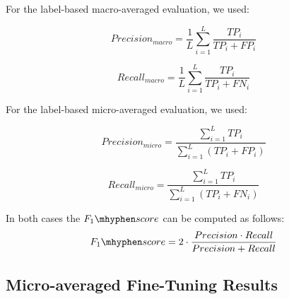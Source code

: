\documentclass[10pt, a4paper]{article}
\begin{document}
For the label-based macro-averaged evaluation, we used:

    \begin{equation*}
      Precision_{macro} = \frac{1}{L}\sum_{i=1}^{L}\frac{TP_i}{TP_i + FP_i}
    \end{equation*}

    \begin{equation*}
      Recall_{macro} = \frac{1}{L}\sum_{i=1}^{L}\frac{TP_i}{TP_i + FN_i}
    \end{equation*}

For the label-based micro-averaged evaluation, we used:

    \begin{equation*}
      Precision_{micro} = \frac{\sum_{i=1}^{L} TP_i}{\sum_{i=1}^{L} (TP_i + FP_i)}
    \end{equation*}

    \begin{equation*}
      Recall_{micro} = \frac{\sum_{i=1}^{L} TP_i}{\sum_{i=1}^{L} (TP_i + FN_i)}
    \end{equation*}

In both cases the $F_1\mhyphen score$ can be computed as follows:
    \begin{equation*}
      F_1\mhyphen score = 2  \cdot \frac{Precision \cdot Recall}{Precision +  Recall}
    \end{equation*}




\subsection{Micro-averaged Fine-Tuning Results}
\label{subsec:micro_fine_tuning_results}
\end{document}
